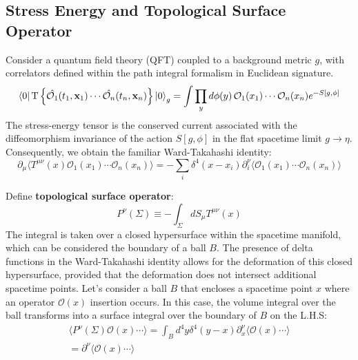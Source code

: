 \documentclass[12pt]{article}
\numberwithin{equation}{section}
\newcommand\<\langle
\renewcommand\>\rangle
\renewcommand\.{\cdot}
\begin{document}
\subsection{Stress Energy and Topological Surface Operator}
Consider a quantum field theory (QFT) coupled to a background metric $g$,  with correlators defined within the path integral formalism in Euclidean signature. 
\begin{equation}
    \bra{0}\text{T}\left\{\hat{\mathcal{O}_1}(t_1,\mathbf{x}_1)\cdots\hat{\mathcal{O}_n}(t_n,\mathbf{x}_n)\right\}\ket{0}_{g} = \int{\prod_{y}d\phi(y)\,\mathcal{O}_1(x_1)\cdots\mathcal{O}_n(x_n)e^{-S[g,\phi]}}
\end{equation}
The stress-energy tensor is the conserved current associated with the diffeomorphism invariance of the action $S[g,\phi]$ in the flat spacetime limit $g\rightarrow\eta$.
Consequently, we obtain the familiar Ward-Takahashi identity:
\begin{equation}
    \partial_{\mu}\langle T^{\mu\nu}(x)\mathcal{O}_1(x_1)\cdots\mathcal{O}_n(x_n)\rangle = -\sum_{i}\delta^4(x-x_i)\partial^{\nu}_{i}\langle\mathcal{O}_1(x_1)\cdots\mathcal{O}_n(x_n)\rangle
\end{equation}

Define \textbf{topological surface operator}:
\begin{equation}
    P^{\nu}(\Sigma)\equiv-\int_{\Sigma}{dS_{\mu}}T^{\mu\nu}(x)
\end{equation}
The integral is taken over a closed hypersurface within the spacetime manifold, which can be considered the boundary of a ball $B$. The presence of delta functions in the Ward-Takahashi identity allows for the deformation of this closed hypersurface, provided that the deformation does not intersect additional spacetime points. Let's consider a ball $B$ that encloses a spacetime point $x$ where an operator $\mathcal{O}(x)$ insertion occurs. In this case, the volume integral over the ball transforms into a surface integral over the boundary of $B$ on the L.H.S:
\begin{equation}
\begin{split}
    \langle P^{\nu}(\Sigma)\mathcal{O}(x)\cdots\rangle = \int_{B}{d^4y\delta^4(y-x)}\partial^{\nu}_{x}\langle\mathcal{O}(x)\cdots\rangle\\
    =\partial^{\nu}\langle\mathcal{O}(x)\cdots\rangle
\end{split}
\end{equation}
\end{document}
